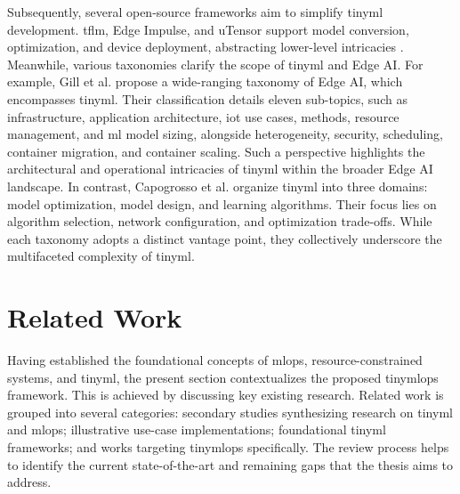 Subsequently, several open-source frameworks aim to simplify \gls{tinyml} development. \Gls{tflm}, Edge Impulse, and uTensor support model conversion, optimization, and device deployment, abstracting lower-level intricacies \cite{duttaTinyMLMeetsIoT2021, rayReviewTinyMLStateoftheart2022, tekinReviewOndeviceMachine2024, tsoukasReviewEmergingTechnology2024}. Meanwhile, various taxonomies clarify the scope of \gls{tinyml} and Edge AI. For example, Gill et al. \cite{gillEdgeAITaxonomy2024} propose a wide-ranging taxonomy of Edge AI, which encompasses \gls{tinyml}. Their classification details eleven sub-topics, such as infrastructure, application architecture, \gls{iot} use cases, methods, resource management, and \gls{ml} model sizing, alongside heterogeneity, security, scheduling, container migration, and container scaling. Such a perspective highlights the architectural and operational intricacies of \gls{tinyml} within the broader Edge AI landscape. In contrast, Capogrosso et al. \cite{capogrossoMachineLearningOrientedSurvey2024} organize \gls{tinyml} into three domains: model optimization, model design, and learning algorithms. Their focus lies on algorithm selection, network configuration, and optimization trade-offs. While each taxonomy adopts a distinct vantage point, they collectively underscore the multifaceted complexity of \gls{tinyml}.

\section{Related Work}
\label{sec:relatedWork}

Having established the foundational concepts of \gls{mlops}, resource-constrained systems, and \gls{tinyml}, the present section contextualizes the proposed \gls{tinymlops} framework. This is achieved by discussing key existing research. Related work is grouped into several categories: secondary studies synthesizing research on \gls{tinyml} and \gls{mlops}; illustrative use-case implementations; foundational \gls{tinyml} frameworks; and works targeting \gls{tinymlops} specifically. The review process helps to identify the current state-of-the-art and remaining gaps that the thesis aims to address.

